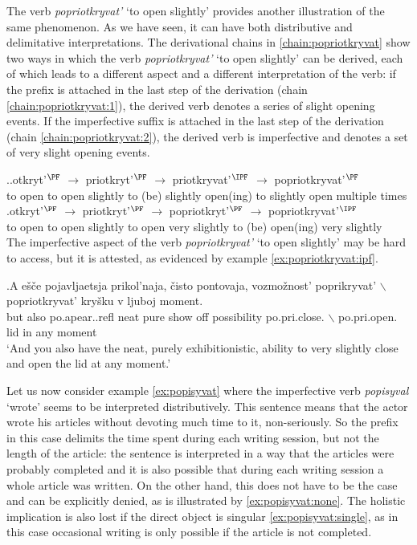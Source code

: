 The verb \textit{popriotkryvat'} `to open slightly' provides another illustration of the same phenomenon. As we have seen, it can have both distributive and delimitative interpretations. The derivational chains in \ref{chain:popriotkryvat} show two ways in which the verb \textit{popriotkryvat'} `to open slightly' can be derived, each of which leads to a different aspect and a different interpretation of the verb: if the prefix  is attached in the last step of the derivation (chain \ref{chain:popriotkryvat:1}), the derived verb denotes a series of slight opening events. If the imperfective suffix is attached in the last step of the derivation (chain \ref{chain:popriotkryvat:2}), the derived verb is imperfective and denotes a set of very slight opening events. 

\ex.\label{chain:popriotkryvat}\ag.\label{chain:popriotkryvat:1}otkryt'$^{\PF}$ $\rightarrow$ priotkryt'$^{\PF}$ $\rightarrow$ priotkryvat'$^{\IPF}$ $\rightarrow$ popriotkryvat'$^{\PF}$\\
{to open} {} {to open slightly} {} {to (be) slightly open(ing)} {} {to slightly open multiple times}\\
\bg.\label{chain:popriotkryvat:2}otkryt'$^{\PF}$ $\rightarrow$ priotkryt'$^{\PF}$ $\rightarrow$ popriotkryt'$^{\PF}$ $\rightarrow$ popriotkryvat'$^{\IPF}$\\
{to open} {} {to open slightly} {} {to open very slightly} {} {to (be) open(ing) very slightly}\\

The imperfective aspect of the verb \textit{popriotkryvat'} `to open slightly' may be hard to access, but it is attested, as evidenced by example \ref{ex:popriotkryvat:ipf}. 

\exg.\label{ex:popriotkryvat:ipf}A e\v{s}\v{c}e pojavljaetsja prikol'naja, \v{c}isto pontovaja, vozmo\v{z}nost' poprikryvat' {$\backslash$} popriotkryvat' kry\v{s}ku v ljuboj moment.\\
but also po.apear..refl neat pure {show off} possibility po.pri.close. {$\backslash$} po.pri.open. lid in any moment\\
`And you also have the neat, purely exhibitionistic, ability to very slightly close and open the lid at any moment.'

Let us now consider example \ref{ex:popisyvat} where the imperfective verb \textit{popisyval} `wrote' seems to be interpreted distributively. This sentence means that the actor wrote his articles without devoting much time to it, non-seriously. So the prefix in this case delimits the time spent during each writing session, but not the length of the article: the sentence is interpreted in a way that the articles were probably completed and it is also possible that during each writing session a whole article was written. On the other hand, this does not have to be the case and can be explicitly denied, as is illustrated by \ref{ex:popisyvat:none}. The holistic implication is also lost if the direct object is singular \ref{ex:popisyvat:single}, as in this case occasional writing is only possible if the article is not completed. 

